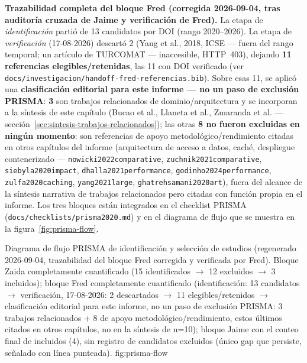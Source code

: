 \textbf{Trazabilidad completa del bloque Fred (corregida 2026-09-04, tras
auditor\'ia cruzada de Jaime y verificaci\'on de Fred).} La etapa de
\emph{identificaci\'on} parti\'o de 13 candidatos por DOI (rango
2020--2026). La etapa de \emph{verificaci\'on} (17-08-2026) descart\'o 2
(Yang et al., 2018, ICSE --- fuera del rango temporal; un art\'iculo de
TURCOMAT --- inaccesible, HTTP~403), dejando \textbf{11 referencias
elegibles/retenidas}, las 11 con DOI verificado (ver
\texttt{docs/investigacion/handoff-fred-referencias.bib}). Sobre esas 11,
se aplic\'o una \textbf{clasificaci\'on editorial para este informe ---
no un paso de exclusi\'on PRISMA}: \textbf{3} son trabajos relacionados
de dominio/arquitectura y se incorporan a la s\'intesis de este cap\'itulo
(Bucao et al., Llaneta et al., Zmaranda et al. ---
secci\'on~\ref{sec:sintesis-trabajos-relacionados}); las otras
\textbf{8 no fueron excluidas en ning\'un momento}: son referencias de
apoyo metodol\'ogico/rendimiento citadas en otros cap\'itulos del informe
(arquitectura de acceso a datos, cach\'e, despliegue contenerizado ---
\texttt{nowicki2022\allowbreak comparative}, \texttt{zuchnik2021\allowbreak comparative},
\texttt{siebyla2020\allowbreak impact}, \texttt{dhalla2021\allowbreak performance},
\texttt{godinho2024\allowbreak performance}, \texttt{zulfa2020\allowbreak caching},
\texttt{yang2021\allowbreak large}, \texttt{ghatrehsamani2020\allowbreak art}), fuera del alcance
de la s\'intesis narrativa de trabajos relacionados pero citadas con
funci\'on propia en el informe. Los tres bloques est\'an integrados en el
checklist PRISMA (\texttt{docs/checklists/prisma2020.md}) y en el
diagrama de flujo que se muestra en la figura~\ref{fig:prisma-flow}.

%
{Diagrama de flujo PRISMA de identificaci\'on y selecci\'on de estudios (regenerado 2026-09-04, trazabilidad del bloque Fred corregida y verificada por Fred). Bloque Zaida completamente cuantificado (15 identificados $\to$ 12 excluidos $\to$ 3 incluidos); bloque Fred completamente cuantificado (identificaci\'on: 13 candidatos $\to$ verificaci\'on, 17-08-2026: 2 descartados $\to$ 11 elegibles/retenidos $\to$ clasificaci\'on editorial para este informe, no un paso de exclusi\'on PRISMA: 3 trabajos relacionados + 8 de apoyo metodol\'ogico/rendimiento, estos \'ultimos citados en otros cap\'itulos, no en la s\'intesis de n=10); bloque Jaime con el conteo final de incluidos (4), sin registro de candidatos excluidos (\'unico gap que persiste, se\~nalado con l\'inea punteada).}%
{fig:prisma-flow}

